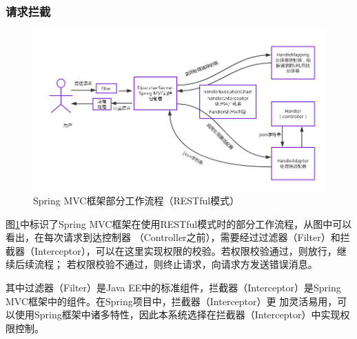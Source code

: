 \documentclass[titlepage,UTF8,linespread=1.5]{ctexart}
\begin{document}
\subsubsection{请求拦截}
\begin{figure}[H]
    \centering
    \includegraphics[width=150mm]{flow-spring-mvc-restful.png}
    \caption{Spring MVC框架部分工作流程（RESTful模式）}
    \label{fig:flow-spring-mvc-restful}
\end{figure}
图\ref{fig:flow-spring-mvc-restful}中标识了Spring MVC框架在使用RESTful模式时的部分工作流程，从图中可以看出，在每次请求到达控制器
（Controller之前），需要经过过滤器（Filter）和拦截器（Interceptor），可以在这里实现权限的校验。若权限校验通过，则放行，继续后续流程；
若权限校验不通过，则终止请求，向请求方发送错误消息。\par
其中过滤器（Filter）是Java EE中的标准组件，拦截器（Interceptor）是Spring MVC框架中的组件。在Spring项目中，拦截器（Interceptor）更
加灵活易用，可以使用Spring框架中诸多特性，因此本系统选择在拦截器（Interceptor）中实现权限控制。\par
\end{document}
